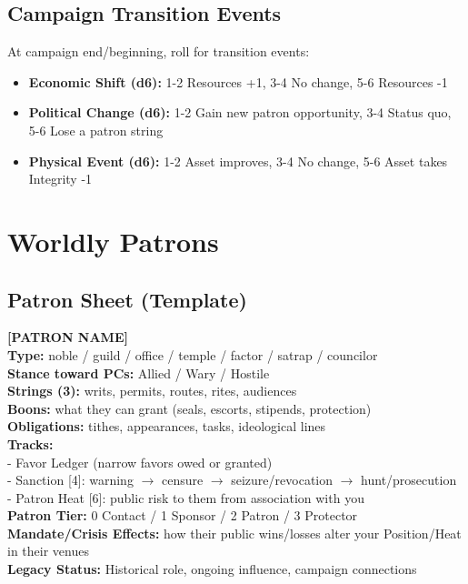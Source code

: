 \documentclass[10pt]{article}
\begin{document}
\begin{center}
    \subsection{Campaign Transition Events}
    At campaign end/beginning, roll for transition events:
    \begin{itemize}
      \item \textbf{Economic Shift (d6):} 1-2 Resources +1, 3-4 No change, 5-6 Resources -1
      \item \textbf{Political Change (d6):} 1-2 Gain new patron opportunity, 3-4 Status quo, 5-6 Lose a patron string
      \item \textbf{Physical Event (d6):} 1-2 Asset improves, 3-4 No change, 5-6 Asset takes Integrity -1
    \end{itemize}
    
    \section{Worldly Patrons}
    \subsection{Patron Sheet (Template)}
    \begin{framed}
    \noindent\textbf{[PATRON NAME]}\\
    \textbf{Type:} noble / guild / office / temple / factor / satrap / councilor\\
    \textbf{Stance toward PCs:} Allied / Wary / Hostile\\
    \textbf{Strings (3):} writs, permits, routes, rites, audiences\\
    \textbf{Boons:} what they can grant (seals, escorts, stipends, protection)\\
    \textbf{Obligations:} tithes, appearances, tasks, ideological lines\\
    \textbf{Tracks:}\\
    \hspace{10pt}- Favor Ledger (narrow favors owed or granted)\\
    \hspace{10pt}- Sanction [4]: warning $\rightarrow$ censure $\rightarrow$ seizure/revocation $\rightarrow$ hunt/prosecution\\
    \hspace{10pt}- Patron Heat [6]: public risk to them from association with you\\
    \textbf{Patron Tier:} 0 Contact / 1 Sponsor / 2 Patron / 3 Protector\\
    \textbf{Mandate/Crisis Effects:} how their public wins/losses alter your Position/Heat in their venues\\
    \textbf{Legacy Status:} Historical role, ongoing influence, campaign connections
    \end{framed}
    

\end{center}
\end{document}
